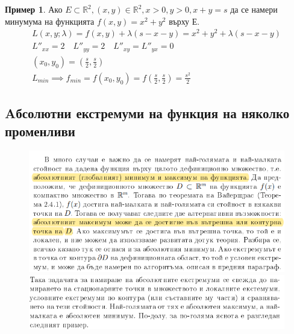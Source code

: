 \documentclass[a4paper,fleqn,12pt]{article}
\theoremstyle{definition}
\newtheorem{example}{Пример}[subsection]
\begin{document}
\begin{example}
Ако $E \subset \mathbb{R}^2, (x,y) \in \mathbb{R}^2, x>0, y>0, x+y = s$ да се намери минумума на функцията $f(x,y) = x^2 + y^2$ върху Е.\\
\begin{gather*}
L(x,y;\lambda) = f(x,y) + \lambda(s - x - y) = x^2 + y^2 + \lambda(s - x - y) \\
L''_{xx} = 2 \quad L''_{yy} = 2 \quad L''_{xy} = L''_{yx} = 0 \\
(x_0,y_0) = \left( \frac{s}{2},\frac{s}{2} \right) \\
L_{min} \implies f_{min} = f(x_0,y_0) = f \left( \frac{s}{2},\frac{s}{2} \right) = \frac{s^2}{2} 
\end{gather*}
\end{example}

\newpage
\subsection{Aбсолютни екстремуми на функция на няколко променливи}
\begin{figure}[htp!]
  \includegraphics{Pics/calc/lec8-1.png}
  \includegraphics{Pics/calc/lec8-2.png}
\end{figure}
\end{document}
